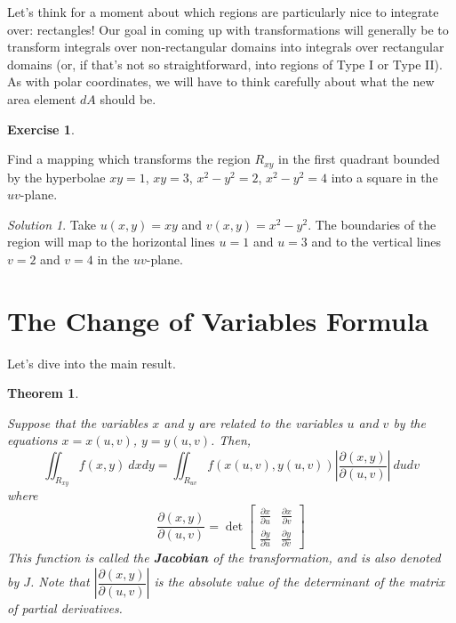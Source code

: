 \documentclass[
]{book}
\newtheorem{theorem}{Theorem}[chapter]
\theoremstyle{definition}
\theoremstyle{definition}
\theoremstyle{definition}
\newtheorem{exercise}{Exercise}[chapter]
\theoremstyle{definition}
\theoremstyle{remark}
\newtheorem*{solution}{Solution}
\begin{document}
Let's think for a moment about which regions are particularly nice to integrate over: rectangles! Our goal in coming up with transformations will generally be to transform integrals over non-rectangular domains into integrals over rectangular domains (or, if that's not so straightforward, into regions of Type I or Type II). As with polar coordinates, we will have to think carefully about what the new area element \(dA\) should be.

\begin{exercise}
\protect\hypertarget{exr:unlabeled-div-97}{}\label{exr:unlabeled-div-97}

Find a mapping which transforms the region \(R_{xy}\) in the first quadrant bounded by the hyperbolae \(xy=1\), \(xy=3\), \(x^2-y^2=2\), \(x^2-y^2=4\) into a square in the \(uv\)-plane.

\end{exercise}

\begin{solution}

Take \(u(x,y)=xy\) and \(v(x,y)=x^2-y^2\). The boundaries of the region will map to the horizontal lines \(u=1\) and \(u=3\) and to the vertical lines \(v=2\) and \(v=4\) in the \(uv\)-plane.

\end{solution}

\hypertarget{the-change-of-variables-formula}{%
\section{The Change of Variables Formula}\label{the-change-of-variables-formula}}

Let's dive into the main result.

\begin{theorem}
\protect\hypertarget{thm:unlabeled-div-99}{}\label{thm:unlabeled-div-99}

Suppose that the variables \(x\) and \(y\) are related to the variables \(u\) and \(v\) by the equations \(x=x(u,v)\), \(y=y(u,v)\). Then, \[\iint_{R_{xy}}f(x,y)~dxdy = \iint_{R_{uv}}f(x(u,v), y(u,v)) \left |\dfrac{\partial(x,y)}{\partial (u,v)}\right|~dudv\]
where \[\dfrac{\partial(x,y)}{\partial (u,v)}=\det\begin{bmatrix}\frac{\partial x}{\partial u}&\frac{\partial x}{\partial v}\\ \frac{\partial y}{\partial u}& \frac{\partial y}{\partial v}\end{bmatrix}\] This function is called the \textbf{Jacobian} of the transformation, and is also denoted by \(J\). Note that \(\left |\dfrac{\partial(x,y)}{\partial (u,v)}\right|\) is the \emph{absolute value} of the determinant of the matrix of partial derivatives.

\end{theorem}
\end{document}
